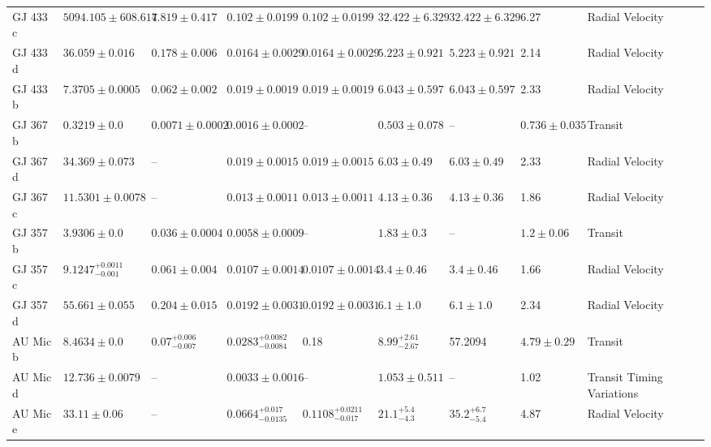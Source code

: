 \begin{tabular}{llllllllll}
GJ 433 c & $5094.105 \pm 608.617$ & $4.819 \pm 0.417$ & $0.102 \pm 0.0199$ & $0.102 \pm 0.0199$ & $32.422 \pm 6.329$ & $32.422 \pm 6.329$ & 6.27 & Radial Velocity & \cite{FENG_ET_AL__2020} \\
GJ 433 d & $36.059 \pm 0.016$ & $0.178 \pm 0.006$ & $0.0164 \pm 0.0029$ & $0.0164 \pm 0.0029$ & $5.223 \pm 0.921$ & $5.223 \pm 0.921$ & 2.14 & Radial Velocity & \cite{FENG_ET_AL__2020} \\
GJ 433 b & $7.3705 \pm 0.0005$ & $0.062 \pm 0.002$ & $0.019 \pm 0.0019$ & $0.019 \pm 0.0019$ & $6.043 \pm 0.597$ & $6.043 \pm 0.597$ & 2.33 & Radial Velocity & \cite{FENG_ET_AL__2020} \\
GJ 367 b & $0.3219 \pm 0.0$ & $0.0071 \pm 0.0002$ & $0.0016 \pm 0.0002$ & -- & $0.503 \pm 0.078$ & -- & $0.736 \pm 0.035$ & Transit & \cite{LEE_ET_AL_2026} \\
GJ 367 d & $34.369 \pm 0.073$ & -- & $0.019 \pm 0.0015$ & $0.019 \pm 0.0015$ & $6.03 \pm 0.49$ & $6.03 \pm 0.49$ & 2.33 & Radial Velocity & \cite{GOFFO_ET_AL_2023} \\
GJ 367 c & $11.5301 \pm 0.0078$ & -- & $0.013 \pm 0.0011$ & $0.013 \pm 0.0011$ & $4.13 \pm 0.36$ & $4.13 \pm 0.36$ & 1.86 & Radial Velocity & \cite{GOFFO_ET_AL_2023} \\
GJ 357 b & $3.9306 \pm 0.0$ & $0.036 \pm 0.0004$ & $0.0058 \pm 0.0009$ & -- & $1.83 \pm 0.3$ & -- & $1.2 \pm 0.06$ & Transit & \cite{ODDO_ET_AL__2023} \\
GJ 357 c & $9.1247^{+0.0011}_{-0.001}$ & $0.061 \pm 0.004$ & $0.0107 \pm 0.0014$ & $0.0107 \pm 0.0014$ & $3.4 \pm 0.46$ & $3.4 \pm 0.46$ & 1.66 & Radial Velocity & \cite{LUQUE_ET_AL__2019} \\
GJ 357 d & $55.661 \pm 0.055$ & $0.204 \pm 0.015$ & $0.0192 \pm 0.0031$ & $0.0192 \pm 0.0031$ & $6.1 \pm 1.0$ & $6.1 \pm 1.0$ & 2.34 & Radial Velocity & \cite{LUQUE_ET_AL__2019} \\
AU Mic b & $8.4634 \pm 0.0$ & $0.07^{+0.006}_{-0.007}$ & $0.0283^{+0.0082}_{-0.0084}$ & 0.18 & $8.99^{+2.61}_{-2.67}$ & 57.2094 & $4.79 \pm 0.29$ & Transit & \cite{MALLORQUIN_ET_AL_2024} \\
AU Mic d & $12.736 \pm 0.0079$ & -- & $0.0033 \pm 0.0016$ & -- & $1.053 \pm 0.511$ & -- & 1.02 & Transit Timing Variations & \cite{WITTROCK_ET_AL__2023} \\
AU Mic e & $33.11 \pm 0.06$ & -- & $0.0664^{+0.017}_{-0.0135}$ & $0.1108^{+0.0211}_{-0.017}$ & $21.1^{+5.4}_{-4.3}$ & $35.2^{+6.7}_{-5.4}$ & 4.87 & Radial Velocity & \cite{DONATI_ET_AL__2025} \\

\end{tabular}
